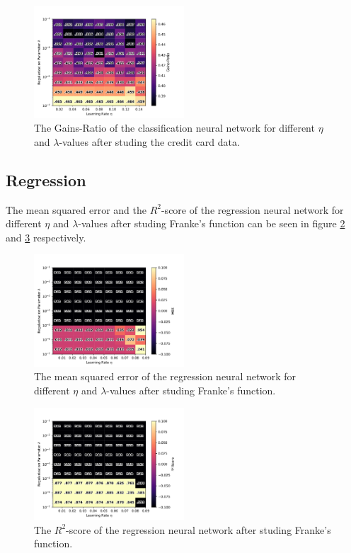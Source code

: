 		\begin{figure}[H]
			\centering
			\includegraphics[width=0.5\textwidth]{figures/cc_res_3.pdf}
			\caption{The Gains-Ratio of the classification neural network for different $\eta$ and $\lambda$-values after studing the credit card data.}
			\label{fig:cc_gr}
		\end{figure}
	
        
        
    \subsection{Regression}
    
    	The mean squared error and the $R^2$-score of the regression neural network for different $\eta$ and $\lambda$-values after studing Franke's function can be seen in figure \ref{fig:ff_mse} and \ref{fig:ff_r2} respectively.
    
    	\begin{figure}[H]
    		\centering
    		\includegraphics[width=0.5\textwidth]{figures/ff_res_0.pdf}
    		\caption{The mean squared error of the regression neural network for different $\eta$ and $\lambda$-values after studing Franke's function.}
    		\label{fig:ff_mse}
    	\end{figure}
    	\begin{figure}[H]
    		\centering
    		\includegraphics[width=0.5\textwidth]{figures/ff_res_1.pdf}
    		\caption{The $R^2$-score of the regression neural network after studing Franke's function.}
    		\label{fig:ff_r2}
    	\end{figure}
    
    
